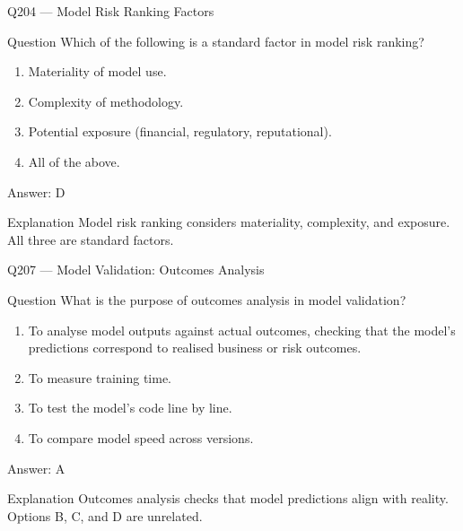 \documentclass[aspectratio=169,8pt]{beamer}
\begin{document}
\begin{frame}{Q204 --- Model Risk Ranking Factors}
\begin{block}{Question}
Which of the following is a standard factor in model risk ranking?
\begin{enumerate}
\item Materiality of model use.
\item Complexity of methodology.
\item Potential exposure (financial, regulatory, reputational).
\item All of the above.
\end{enumerate}  \end{block}
\begin{exampleblock}{Answer: D}\end{exampleblock}
\begin{block}{Explanation}
Model risk ranking considers materiality, complexity, and exposure. All three are standard factors.
\end{block}
\end{frame}



\begin{frame}{Q207 --- Model Validation: Outcomes Analysis}
\begin{block}{Question}
What is the purpose of outcomes analysis in model validation?
\begin{enumerate}
	\item To analyse model outputs against actual outcomes, checking that the model's predictions correspond to realised business or risk outcomes.
	\item To measure training time.
	\item To test the model's code line by line.
	\item To compare model speed across versions.
\end{enumerate}  \end{block}
\begin{exampleblock}{Answer: A}\end{exampleblock}
\begin{block}{Explanation}
	Outcomes analysis checks that model predictions align with reality. Options B, C, and D are unrelated.
\end{block}
															\end{frame}
															
										
																
								
																	
\end{document}
